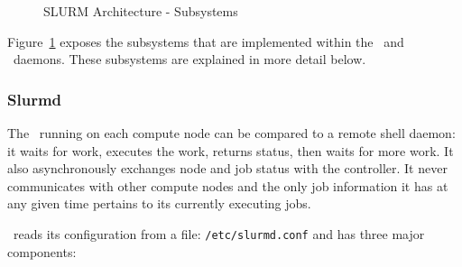 \begin{figure}[tb]
\centerline{}
\caption{SLURM Architecture - Subsystems}
\label{archdetail}
\end{figure}

Figure~\ref{archdetail} exposes the subsystems that are implemented
within the \slurmd\ and \slurmctld\ daemons.  These subsystems
are explained in more detail below.

\subsubsection{Slurmd}

The \slurmd\ running on each compute node can be compared to a remote
shell daemon:  it waits for work, executes the work, returns status,
then waits for more work.  It also asynchronously exchanges node and job
status with the controller.  It never communicates with other compute
nodes and the only job information it has at any given time pertains to
its currently executing jobs.

\slurmd\ reads its configuration from a file: {\tt /etc/slurmd.conf}
and has three major components:

